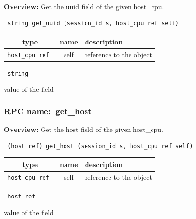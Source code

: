 {\bf Overview:} 
Get the uuid field of the given host\_cpu.

\begin{verbatim} string get_uuid (session_id s, host_cpu ref self)\end{verbatim}



 
\vspace{0.3cm}
\begin{tabular}{|c|c|p{7cm}|}
 \hline
{\bf type} & {\bf name} & {\bf description} \\ \hline
{\tt host\_cpu ref } & self & reference to the object \\ \hline 

\end{tabular}

\vspace{0.3cm}

{\tt 
string
}


value of the field
\vspace{0.3cm}
\vspace{0.3cm}
\vspace{0.3cm}
\subsubsection{RPC name:~get\_host}

{\bf Overview:} 
Get the host field of the given host\_cpu.

\begin{verbatim} (host ref) get_host (session_id s, host_cpu ref self)\end{verbatim}



 
\vspace{0.3cm}
\begin{tabular}{|c|c|p{7cm}|}
 \hline
{\bf type} & {\bf name} & {\bf description} \\ \hline
{\tt host\_cpu ref } & self & reference to the object \\ \hline 

\end{tabular}

\vspace{0.3cm}

{\tt 
host ref
}


value of the field
\vspace{0.3cm}
\vspace{0.3cm}
\vspace{0.3cm}
